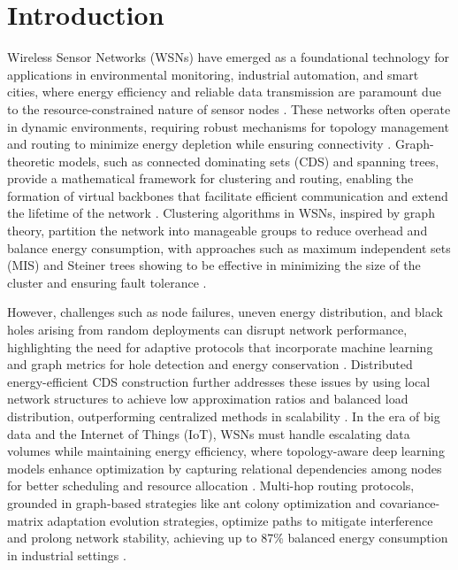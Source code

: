 \documentclass[a4paper,fleqn]{cas-dc}
\numberwithin{equation}{section}
\begin{document}
\maketitle

\section{Introduction}

Wireless Sensor Networks (WSNs) have emerged as a foundational technology for applications in environmental monitoring, industrial automation, and smart cities, where energy efficiency and reliable data transmission are paramount due to the resource-constrained nature of sensor nodes \cite{r1,r18}. These networks often operate in dynamic environments, requiring robust mechanisms for topology management and routing to minimize energy depletion while ensuring connectivity \cite{r6,r29}. Graph-theoretic models, such as connected dominating sets (CDS) and spanning trees, provide a mathematical framework for clustering and routing, enabling the formation of virtual backbones that facilitate efficient communication and extend the lifetime of the network \cite{r6,r7}. Clustering algorithms in WSNs, inspired by graph theory, partition the network into manageable groups to reduce overhead and balance energy consumption, with approaches such as maximum independent sets (MIS) and Steiner trees showing to be effective in minimizing the size of the cluster and ensuring fault tolerance \cite{r6,r9}.

However, challenges such as node failures, uneven energy distribution, and black holes arising from random deployments can disrupt network performance, highlighting the need for adaptive protocols that incorporate machine learning and graph metrics for hole detection and energy conservation \cite{r8,r11}. Distributed energy-efficient CDS construction further addresses these issues by using local network structures to achieve low approximation ratios and balanced load distribution, outperforming centralized methods in scalability \cite{r7,r9}. In the era of big data and the Internet of Things (IoT), WSNs must handle escalating data volumes while maintaining energy efficiency, where topology-aware deep learning models enhance optimization by capturing relational dependencies among nodes for better scheduling and resource allocation \cite{r19,r27}. Multi-hop routing protocols, grounded in graph-based strategies like ant colony optimization and covariance-matrix adaptation evolution strategies, optimize paths to mitigate interference and prolong network stability, achieving up to 87\% balanced energy consumption in industrial settings \cite{r8,r9}.
\end{document}
